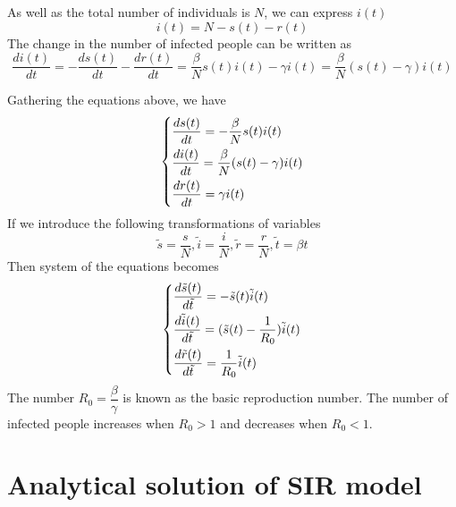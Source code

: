 \documentclass[12pt, a4paper]{article}
\begin{document}
	\newpage
	
	As well as the total number of individuals is $N$, we can express $i(t)$
	\begin{equation}
		i(t) = N - s(t) - r(t)
	\end{equation}
	The change in the number of infected people can be written as
	\begin{equation}
		\frac{di(t)}{dt} = - \frac{ds(t)}{dt} - \frac{dr(t)}{dt} = \frac{\beta}{N} s(t) i(t) - \gamma i(t) = \frac{\beta}{N} (s(t) - \gamma) i(t)
	\end{equation}

	Gathering the equations above, we have
	\begin{equation}
		\begin{dcases}
			\frac{ds(t)}{dt} = - \frac{\beta}{N} s(t) i(t) \\
			\frac{di(t)}{dt} = \frac{\beta}{N} (s(t) - \gamma) i(t) \\
			\frac{dr(t)}{dt} = \gamma i(t)
		\end{dcases}
	\end{equation}
	If we introduce the following transformations of variables
	\[
		\tilde{s} = \frac{s}{N}, \tilde{i} = \frac{i}{N}, \tilde{r} = \frac{r}{N}, \tilde{t} = \beta t
	\]
	Then system of the equations becomes
	\begin{equation}
		\begin{dcases}
			\frac{d \tilde{s} (t)}{d \tilde{t}} = - \tilde{s}(t) \tilde{i}(t) \\
			\frac{d \tilde{i}(t)}{d \tilde{t}} = (\tilde{s}(t) - \frac{1}{R_0}) \tilde{i}(t) \\
			\frac{d \tilde{r}(t)}{d \tilde{t}} = \frac{1}{R_0} \tilde{i}(t)
		\end{dcases}
	\end{equation}
	The number $R_0 = \dfrac{\beta}{\gamma}$ is known as the basic reproduction number. The number of infected people increases when $R_0 > 1$ and decreases when $R_0 < 1$.
	
	\section{Analytical solution of SIR model}

	
	
\end{document}

